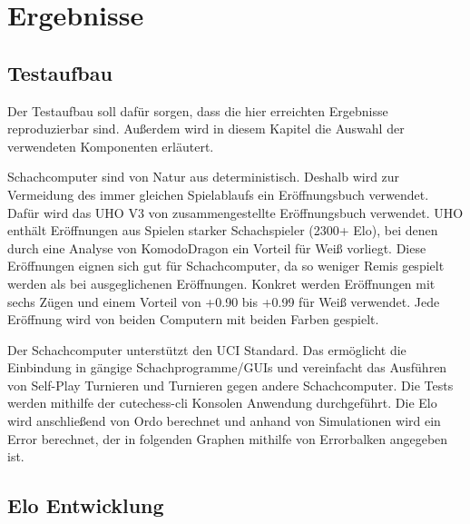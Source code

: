 \chapter{Ergebnisse}
\label{chap:Ergebnisse}

\section{Testaufbau}

Der Testaufbau soll dafür sorgen, dass die hier erreichten Ergebnisse reproduzierbar sind. Außerdem wird in diesem Kapitel die Auswahl der verwendeten Komponenten erläutert.

Schachcomputer sind von Natur aus deterministisch. Deshalb wird zur Vermeidung des immer gleichen Spielablaufs ein Eröffnungsbuch verwendet. Dafür wird das \ac{UHO} V3 von \citeauthor{Pohl2021} \cite{Pohl2021} zusammengestellte Eröffnungsbuch verwendet. \ac{UHO} enthält Eröffnungen aus Spielen starker Schachspieler (2300+ Elo), bei denen durch eine Analyse von KomodoDragon \cite{KomodoDragon} ein Vorteil für Weiß vorliegt. Diese Eröffnungen eignen sich gut für Schachcomputer, da so weniger Remis gespielt werden als bei ausgeglichenen Eröffnungen. Konkret werden Eröffnungen mit sechs Zügen und einem Vorteil von +0.90 bis +0.99 für Weiß verwendet. Jede Eröffnung wird von beiden Computern mit beiden Farben gespielt.

Der Schachcomputer unterstützt den \ac{UCI} Standard. Das ermöglicht die Einbindung in gängige Schachprogramme/GUIs und vereinfacht das Ausführen von Self-Play Turnieren und Turnieren gegen andere Schachcomputer. Die Tests werden mithilfe der cutechess-cli \cite{CutechessRepo} Konsolen Anwendung durchgeführt. Die Elo wird anschließend von Ordo \cite{OrdoRepo} berechnet und anhand von Simulationen wird ein Error berechnet, der in folgenden Graphen mithilfe von Errorbalken angegeben ist.

\section{Elo Entwicklung}


